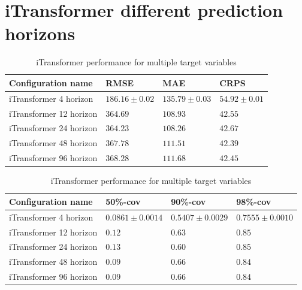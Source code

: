 \documentclass[class=scrbook, crop=false]{standalone}
\begin{document}
\section{iTransformer different prediction horizons}


 \begin{table}[]
\centering
\begin{tabular}{l|l|l|l}
 Configuration name			&  RMSE 			& MAE 			& CRPS 	\\\hline
 iTransformer 4 horizon			& $186.16 \pm 0.02	$&$ 135.79 \pm 0.03	$&$54.92 \pm 0.01$\\
 iTransformer 12 horizon		&$ 364.69		$&$108.93	$&$42.55	$ \\
 iTransformer 24 horizon		&$364.23		$&$ 108.26	$&$42.67	$\\
 iTransformer 48 horizon		&$ 367.78		$&$ 111.51	$&$42.39	$ \\
 iTransformer 96 horizon		&$ 368.28		$&$ 111.68	$&$42.45	$\\
\end{tabular}
\caption{iTransformer performance for multiple target variables}
\label{Table::Performance_targets}
\end{table}
\begin{table}
\centering
\begin{tabular}{l|l|l|l}
 Configuration name			&   50\%-cov 		& 90\%-cov 		& 98\%-cov \\\hline
 iTransformer 4 horizon			&$0.0861 \pm 0.0014	$&$ 0.5407\pm 0.0029 	$&$0.7555 \pm 0.0010 $\\
 iTransformer 12 horizon		&$0.12		$&$ 0.63	$ &$ 0.85$ \\
 iTransformer 24 horizon		&$0.13		$&$0.60	 $&$0.85 $\\
 iTransformer 48 horizon		&$0.09		$&$ 0.66	 $&$ 0.84$ \\
 iTransformer 96 horizon		&$0.09		$&$ 0.66	 $&$ 0.84 $\\
\end{tabular}
\caption{iTransformer performance for multiple target variables}
\label{Table::Performance_targets}
\end{table}
\end{document}
